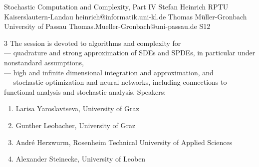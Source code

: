 \begin{session}
 {Stochastic Computation and Complexity, Part IV}%
 {Stefan Heinrich}%
 {RPTU Kaiserslautern-Landau}%
 {heinrich@informatik.uni-kl.de}%
 {Thomas M\"uller-Gronbach}%
 {University of Passau}%
 {Thomas.Mueller-Gronbach@uni-passau.de}%
 {S12}%
 {}%

 {3} %
 The session is devoted to algorithms and complexity for\\
 --- quadrature and strong approximation of SDEs and SPDEs, in particular under nonstandard assumptions,\\
 --- high and infinite dimensional integration and approximation, and\\
 --- stochastic optimization and neural networks,
 including connections to functional analysis and stochastic analysis.
 \medskip
 Speakers:
 \begin{enumerate}
 \item Larisa Yaroslavtseva, University of Graz
 \item Gunther Leobacher, University of Graz
 \item Andr\'e Herzwurm, Rosenheim Technical University of Applied Sciences
 \item Alexander Steinecke, University of Leoben
 \end{enumerate}
\end{session}



\clearpage

